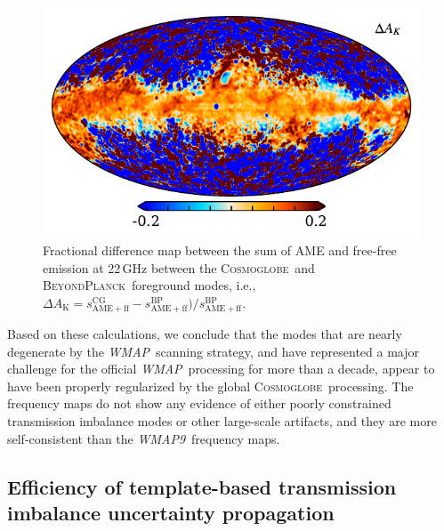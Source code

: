\documentclass[twocolumn]{../../common/aa}
\def\WMAP{\emph{WMAP}}
\def\WMAPnine{\emph{WMAP9}}
\newcommand{\bp}{\textsc{BeyondPlanck}}
\newcommand{\cosmoglobe}{\textsc{Cosmoglobe}}
\begin{document}
\begin{figure}
	\centering
	\includegraphics[width=\columnwidth]{figures/frac_diff_22GHz_sum.pdf}
	\caption{Fractional difference map between the sum of AME and free-free emission at 22\,GHz between the \cosmoglobe\ and \bp\ foreground modes, i.e., $\Delta A_{\mathrm{K}}=s^{\mathrm{CG}}_{\mathrm{AME}+\mathrm{ff}}-s^{\mathrm{BP}}_{\mathrm{AME}+\mathrm{ff}})/s^{\mathrm{BP}}_{\mathrm{AME}+\mathrm{ff}}$.}
	\label{fig:intensity_foregrounds_diff}
\end{figure}


Based on these calculations, we conclude that the modes that are nearly degenerate by the \WMAP\ scanning strategy, and have represented a major challenge for the official \WMAP\ processing for more than a decade, appear to have been properly regularized by the global \cosmoglobe\ processing. The frequency maps do not show any evidence of either poorly constrained transmission imbalance modes or other large-scale artifacts, and they are more self-consistent than the \WMAPnine\ frequency maps.




\subsection{Efficiency of template-based transmission imbalance uncertainty propagation}
\label{subsec:imbalance_template}
\end{document}
